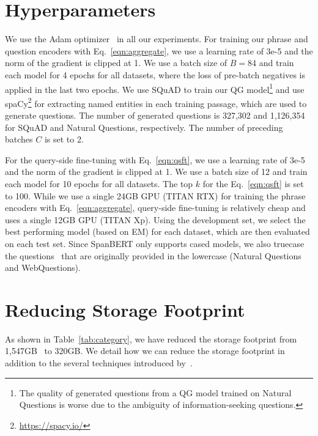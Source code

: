 \documentclass[11pt,a4paper]{article}
\begin{document}
\section{Hyperparameters}\label{apdx:hyper}
We use the Adam optimizer~\citep{kingma2014adam} in all our experiments.
For training our phrase and question encoders with Eq.~\eqref{eqn:aggregate}, we use a learning rate of 3e-5 and the norm of the gradient is clipped at 1.
We use a batch size of $B=$84 and train each model for 4 epochs for all datasets, where the loss of pre-batch negatives is applied in the last two epochs.
We use SQuAD to train our QG model\footnote{The quality of generated questions from a QG model trained on Natural Questions is worse due to the ambiguity of information-seeking questions.} and use spaCy\footnote{\url{https://spacy.io/}} for extracting named entities in each training passage, which are used to generate questions.
The number of generated questions is 327,302 and 1,126,354 for SQuAD and Natural Questions, respectively.
The number of preceding batches $C$ is set to 2.

For the query-side fine-tuning with Eq.~\eqref{eqn:qsft}, we use a learning rate of 3e-5 and the norm of the gradient is clipped at 1.
We use a batch size of 12 and train each model for 10 epochs for all datasets.
The top $k$ for the Eq.~\eqref{eqn:qsft} is set to 100.
While we use a single 24GB GPU (TITAN RTX) for training the phrase encoders with Eq.~\eqref{eqn:aggregate}, query-side fine-tuning is relatively cheap and uses a single 12GB GPU (TITAN Xp).
Using the development set, we select the best performing model (based on EM) for each dataset, which are then evaluated on each test set.
Since SpanBERT only supports cased models, we also truecase the questions~\citep{lita2003truecasing} that are originally provided in the lowercase (Natural Questions and WebQuestions).









\section{Reducing Storage Footprint}\label{apdx:storage}
As shown in Table~\ref{tab:category}, we have reduced the storage footprint from 1,547GB~\citep{lee2020contextualized} to 320GB.
We detail how we can reduce the storage footprint in addition to the several techniques introduced by~\citet{seo2019real}.
\end{document}
